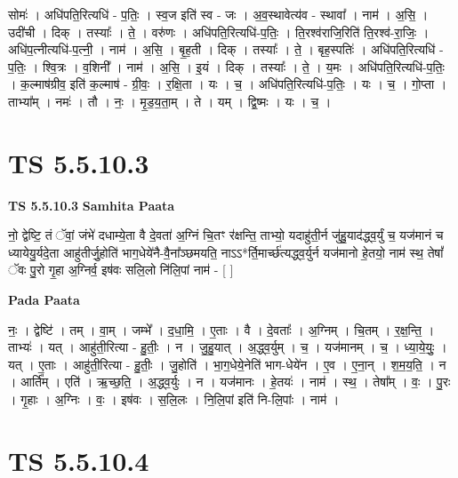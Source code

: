 \documentclass[17pt]{extarticle}
\begin{document}
सोमः॑ । अधि॑पति॒रित्यधि॑ - प॒तिः॒ । स्व॒ज इति॑ स्व - जः । अ॒व॒स्थावेत्य॑व - स्थावा᳚ । नाम॑ । अ॒सि॒ । उदी॑ची । दिक् । तस्याः᳚ । ते॒ । वरु॑णः । अधि॑पति॒रित्यधि॑-प॒तिः॒ । ति॒रश्व॑राजि॒रिति॑ ति॒रश्व॑-रा॒जिः॒ । अधि॑प॒त्नीत्यधि॑-प॒त्नी॒ । नाम॑ । अ॒सि॒ । बृ॒ह॒ती । दिक् । तस्याः᳚ । ते॒ । बृह॒स्पतिः॑ । अधि॑पति॒रित्यधि॑ - प॒तिः॒ । श्वि॒त्रः । व॒शिनी᳚ । नाम॑ । अ॒सि॒ । इ॒यं । दिक् । तस्याः᳚ । ते॒ । य॒मः । अधि॑पति॒रित्यधि॑-प॒तिः॒ । क॒ल्माष॑ग्रीव॒ इति॑ क॒ल्माष॑ - ग्री॒वः॒ । र॒क्षि॒ता । यः । च॒ । अधि॑पति॒रित्यधि॑-प॒तिः॒ । यः । च॒ । गो॒प्ता । ताभ्या᳚म् । नमः॑ । तौ । नः॒ । मृ॒ड॒य॒ता॒म् । ते । यम् । द्वि॒ष्मः । यः । च॒ ।  \newline





\section{ TS 5.5.10.3 }

\textbf{TS 5.5.10.3 } \newline
\textbf{Samhita Paata} \newline

नो॒ द्वेष्टि॒ तं ॅवां॒ जंभे॑ दधाम्ये॒ता वै दे॒वता॑ अ॒ग्निं चि॒तꣳ र॑क्षन्ति॒ ताभ्यो॒ यदाहु॑ती॒र्न जु॑हु॒याद॑द्ध्व॒र्युं च॒ यज॑मानं च ध्यायेयु॒र्यदे॒ता आहु॑तीर्जु॒होति॑ भाग॒धेये॑नै-वै॒ना᳚ञ्छमयति॒ नाऽऽ*र्ति॒मार्च्छ॑त्यद्ध्व॒र्युर्न यज॑मानो हे॒तयो॒ नाम॑ स्थ॒ तेषां᳚ ॅवः पु॒रो गृ॒हा अ॒ग्निर्व॒ इष॑वः सलि॒लो नि॑लि॒पां नाम॑ - [  ] \newline

\textbf{Pada Paata} \newline

नः॒ । द्वेष्टि॑ । तम् । वा॒म् । जम्भे᳚ । द॒धा॒मि॒ । ए॒ताः । वै । दे॒वताः᳚ । अ॒ग्निम् । चि॒तम् । र॒क्ष॒न्ति॒ । ताभ्यः॑ । यत् । आहु॑ती॒रित्या - हु॒तीः॒ । न । जु॒हु॒यात् । अ॒द्ध्व॒र्युम् । च॒ । यज॑मानम् । च॒ । ध्या॒ये॒युः॒ । यत् । ए॒ताः । आहु॑ती॒रित्या - हु॒तीः॒ । जु॒होति॑ । भा॒ग॒धेये॒नेति॑ भाग-धेये॑न । ए॒व । ए॒ना॒न् । श॒म॒य॒ति॒ । न । आर्ति᳚म् । एति॑ । ऋ॒च्छ॒ति॒ । अ॒द्ध्व॒र्युः । न । यज॑मानः । हे॒तयः॑ । नाम॑ । स्थ॒ । तेषा᳚म् । वः॒ । पु॒रः । गृ॒हाः । अ॒ग्निः । वः॒ । इष॑वः । स॒लि॒लः । नि॒लि॒पां इति॑ नि-लि॒पांः । नाम॑ ।  \newline





\section{ TS 5.5.10.4 }
\end{document}
